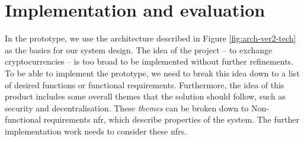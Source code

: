 \section{Implementation and evaluation}\label{sec:implementation}
% 
In the prototype, we use the architecture described in Figure \ref{fig:arch-ver2-tech} as the basics for our system design. The idea of the project -- to exchange cryptocurrencies -- is too broad to be implemented without further refinements. To be able to implement the prototype, we need to break this idea down to a list of desired functions or functional requirements. Furthermore, the idea of this product includes some overall themes that the solution should follow, such as security and decentralisation. These \textit{themes} can be broken down to Non-functional requirements \acrshort{nfr}, which describe properties of the system. The further implementation work needs to consider these \acrshort{nfr}s.














